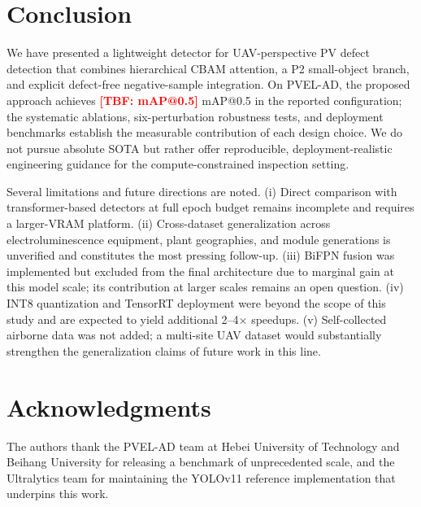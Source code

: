 \documentclass[journal,onecolumn,11pt]{IEEEtran}
\makeatletter
\newcommand{\TBF}[1]{\textcolor{red}{\textbf{[TBF: #1]}}} %
\newcommand{\mAPHalf}{\TBF{mAP@0.5}}
\makeatother
\begin{document}
\section{Conclusion}
\label{sec:conclusion}

We have presented a lightweight detector for UAV-perspective PV defect detection that combines hierarchical CBAM attention, a P2 small-object branch, and explicit defect-free negative-sample integration. On PVEL-AD, the proposed approach achieves \mAPHalf{} mAP@0.5 in the reported configuration; the systematic ablations, six-perturbation robustness tests, and deployment benchmarks establish the measurable contribution of each design choice. We do not pursue absolute SOTA but rather offer reproducible, deployment-realistic engineering guidance for the compute-constrained inspection setting.

Several limitations and future directions are noted. (i) Direct comparison with transformer-based detectors at full epoch budget remains incomplete and requires a larger-VRAM platform. (ii) Cross-dataset generalization across electroluminescence equipment, plant geographies, and module generations is unverified and constitutes the most pressing follow-up. (iii) BiFPN fusion was implemented but excluded from the final architecture due to marginal gain at this model scale; its contribution at larger scales remains an open question. (iv) INT8 quantization and TensorRT deployment were beyond the scope of this study and are expected to yield additional 2--4$\times$ speedups. (v) Self-collected airborne data was not added; a multi-site UAV dataset would substantially strengthen the generalization claims of future work in this line.

\section*{Acknowledgments}
The authors thank the PVEL-AD team at Hebei University of Technology and Beihang University for releasing a benchmark of unprecedented scale, and the Ultralytics team for maintaining the YOLOv11 reference implementation that underpins this work.



\end{document}
